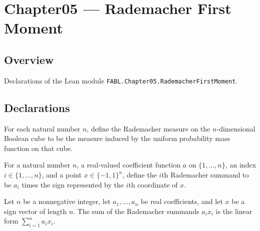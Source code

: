 \chapter{Chapter05 — Rademacher First Moment}
\section{Overview}

Declarations of the Lean module \texttt{FABL.Chapter05.RademacherFirstMoment}.

\section{Declarations}

\begin{definition}
\label{FABL.rademacherMeasure}
\leanok
{}
For each natural number $n$, define the Rademacher measure on the $n$-dimensional
Boolean cube to be the measure induced by the uniform probability mass function on that
cube.
\end{definition}

\begin{definition}
\label{FABL.rademacherSummand}
\leanok
{}
For a natural number $n$, a real-valued coefficient function $a$ on $\{1,\ldots,n\}$, an
index $i\in\{1,\ldots,n\}$, and a point $x\in\{-1,1\}^n$, define the $i$th Rademacher
summand to be $a_i$ times the sign represented by the $i$th coordinate of $x$.
\end{definition}

\begin{theorem}
\label{FABL.sum_rademacherSummand}
\leanok
{}
Let $n$ be a nonnegative integer, let $a_1,\ldots,a_n$ be real coefficients, and let $x$
be a sign vector of length $n$. The sum of the Rademacher summands $a_i x_i$ is the
linear form $\sum_{i=1}^n a_i x_i$.
\end{theorem}

